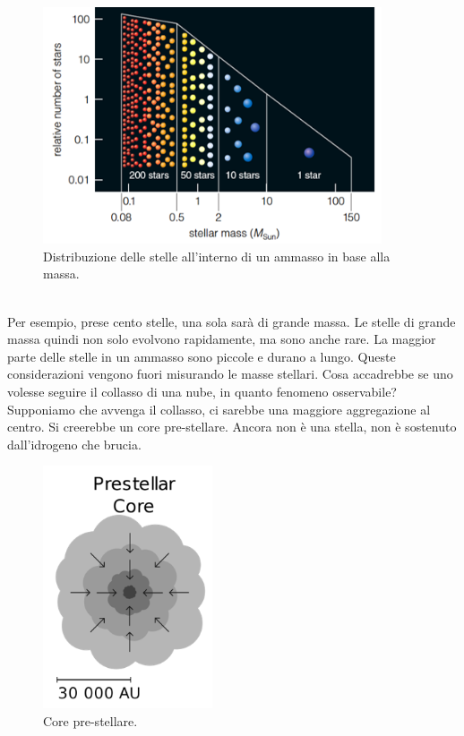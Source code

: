 \documentclass[a4paper,11pt]{article}
\begin{document}
\begin{figure}[h!!]
        \centering
        \includegraphics[width=10cm]{lezione 28 novembre/demografiastelle.png}
        \caption{Distribuzione delle stelle all'interno di un ammasso in base alla massa.}
        \label{lezione 28 novembre/demografiastelle.png}
    \end{figure}
    \\
Per esempio, prese cento stelle, una sola sarà di grande massa. Le stelle di grande massa quindi non solo evolvono rapidamente, ma sono anche rare. La maggior parte delle stelle in un ammasso sono piccole e durano a lungo. Queste considerazioni vengono fuori misurando le masse stellari. Cosa accadrebbe se uno volesse seguire il collasso di una nube, in quanto fenomeno osservabile? Supponiamo che avvenga il collasso, ci sarebbe una maggiore aggregazione al centro. Si creerebbe un core pre-stellare. Ancora non è una stella, non è sostenuto dall'idrogeno che brucia. 
\begin{figure}[h!!]
        \centering
        \includegraphics[width=5cm]{lezione 28 novembre/coreprestellare.png}
        \caption{Core pre-stellare.}
        \label{lezione 28 novembre/coreprestellare.png}
    \end{figure}
\end{document}
